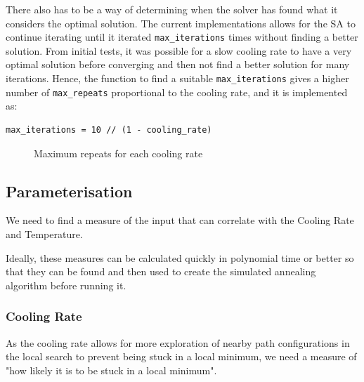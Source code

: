\documentclass{article}
\begin{document}
There also has to be a way of determining when the solver has found what it considers the optimal solution.
The current implementations allows for the SA to continue iterating until it iterated \texttt{max\_iterations} times without finding a better solution.
From initial tests, it was possible for a slow cooling rate to have a very optimal solution before converging and then not find a better solution for many iterations.
Hence, the function to find a suitable \texttt{max\_iterations} gives a higher number of \texttt{max\_repeats} proportional to the cooling rate, and it is implemented as:

\begin{verbatim}
max_iterations = 10 // (1 - cooling_rate)
\end{verbatim}

\begin{figure}[H]
    \centering
    \caption{Maximum repeats for each cooling rate}
\end{figure}

\subsection{Parameterisation}

We need to find a measure of the input that can correlate with the Cooling Rate and Temperature.

Ideally, these measures can be calculated quickly in polynomial time or better so that they can be found and then used to create the simulated annealing algorithm before running it.

\subsubsection{Cooling Rate}

As the cooling rate allows for more exploration of nearby path configurations in the local search to prevent being stuck in a local minimum, we need a measure of "how likely it is to be stuck in a local minimum".
\end{document}
